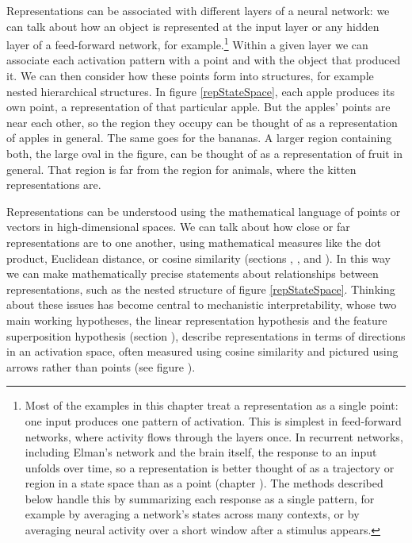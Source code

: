 Representations can be associated with different layers of a neural network: we can talk about how an object is represented at the input layer or any hidden layer of a feed-forward network, for example.\footnote{Most of the examples in this chapter treat a representation as a single point: one input produces one pattern of activation. This is simplest in feed-forward networks, where activity flows through the layers once. In recurrent networks, including Elman's network and the brain itself, the response to an input unfolds over time, so a representation is better thought of as a trajectory or region in a state space than as a point (chapter ). The methods described below handle this by summarizing each response as a single pattern, for example by averaging a network's states across many contexts, or by averaging neural activity over a short window after a stimulus appears.} Within a given layer we can associate each activation pattern with a point and with the object that produced it. We can then consider how these points form into structures, for example nested hierarchical structures. In figure \ref{repStateSpace}, each apple produces its own point, a representation of that particular apple. But the apples' points are near each other, so the region they occupy can be thought of as a representation of apples in general. The same goes for the bananas. A larger region containing both, the large oval in the figure, can be thought of as a representation of fruit in general. That region is far from the region for animals, where the kitten representations are.

Representations can be understood using the mathematical language of points or vectors in high-dimensional spaces.  We can talk about how close or far representations are to one another, using mathematical measures like the dot product, Euclidean distance, or cosine similarity (sections , , and ). In this way we can make mathematically precise statements about relationships between representations, such as the nested structure of figure \ref{repStateSpace}. Thinking about these issues has become central to mechanistic interpretability, whose two main working hypotheses, the linear representation hypothesis and the feature superposition hypothesis (section ), describe representations in terms of directions in an activation space, often measured using cosine similarity and pictured using arrows rather than points (see figure ).

